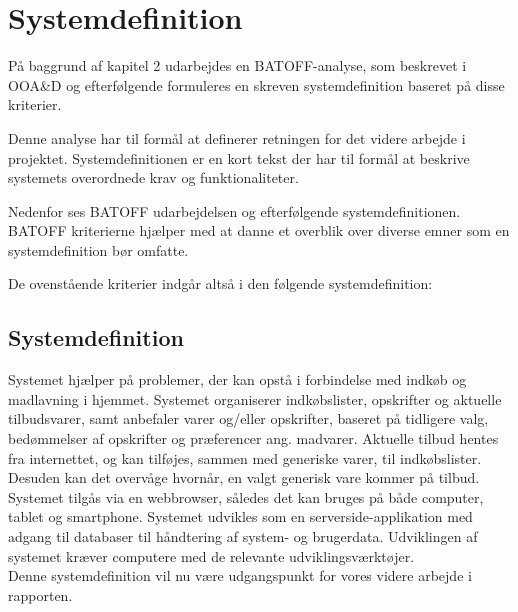 \section{Systemdefinition}
På baggrund af kapitel 2 udarbejdes en BATOFF-analyse, som beskrevet i OOA\&D\citep{OOA&D2001} og efterfølgende formuleres en skreven systemdefinition baseret på disse kriterier.

Denne analyse har til formål at definerer retningen for det videre arbejde i projektet.
Systemdefinitionen er en kort tekst der har til formål at beskrive systemets overordnede krav og funktionaliteter.

Nedenfor ses BATOFF udarbejdelsen og efterfølgende systemdefinitionen.
BATOFF kriterierne hjælper med at danne et overblik over diverse emner som en systemdefinition bør omfatte.



De ovenstående kriterier indgår altså i den følgende systemdefinition:

\subsection{Systemdefinition}

Systemet hjælper på problemer, der kan opstå i forbindelse med indkøb og madlavning i hjemmet.
Systemet organiserer indkøbslister, opskrifter og aktuelle tilbudsvarer, samt anbefaler varer og/eller opskrifter, baseret på tidligere valg, bedømmelser af opskrifter og præferencer ang. madvarer.
Aktuelle tilbud hentes fra internettet, og kan tilføjes, sammen med generiske varer, til indkøbslister.
Desuden kan det overvåge hvornår, en valgt generisk vare kommer på tilbud.
Systemet tilgås via en webbrowser, således det kan bruges på både computer, tablet og smartphone.
Systemet udvikles som en serverside-applikation med adgang til databaser til håndtering af system- og brugerdata.
Udviklingen af systemet kræver computere med de relevante udviklingsværktøjer.\\

Denne systemdefinition vil nu være udgangspunkt for vores videre arbejde i rapporten.
